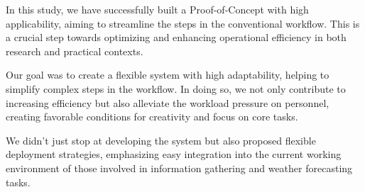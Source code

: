 In this study, we have successfully built a Proof-of-Concept with high applicability, aiming to streamline the steps in the conventional workflow.
This is a crucial step towards optimizing and enhancing operational efficiency in both research and practical contexts.

Our goal was to create a flexible system with high adaptability, helping to simplify complex steps in the workflow.
In doing so, we not only contribute to increasing efficiency but also alleviate the workload pressure on personnel, creating favorable conditions for creativity and focus on core tasks.

We didn't just stop at developing the system but also proposed flexible deployment strategies, emphasizing easy integration into the current working environment of those involved in information gathering and weather forecasting tasks.

